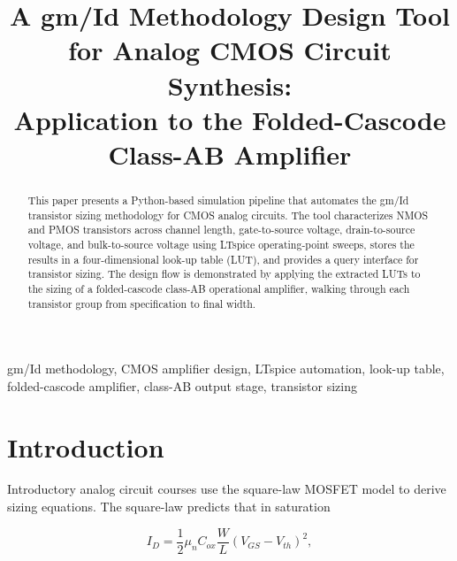 \documentclass[conference]{IEEEtran}
\begin{document}
\title{A gm/Id Methodology Design Tool for Analog CMOS Circuit Synthesis:\\
Application to the Folded-Cascode Class-AB Amplifier}

\author{
}

\maketitle

\begin{abstract}
This paper presents a Python-based simulation pipeline that automates the
gm/Id transistor sizing methodology for CMOS analog circuits.  The tool
characterizes NMOS and PMOS transistors across channel length, gate-to-source
voltage, drain-to-source voltage, and bulk-to-source voltage using LTspice
operating-point sweeps, stores the results in a four-dimensional look-up
table (LUT), and provides a query interface for transistor sizing.  The
design flow is demonstrated by applying the extracted LUTs to the sizing of
a folded-cascode class-AB operational amplifier, walking through each
transistor group from specification to final width.
\end{abstract}

\begin{IEEEkeywords}
gm/Id methodology, CMOS amplifier design, LTspice automation, look-up
table, folded-cascode amplifier, class-AB output stage, transistor sizing
\end{IEEEkeywords}

\section{Introduction}

Introductory analog circuit courses use the square-law MOSFET model to
derive sizing equations.  The square-law predicts that in saturation

\begin{equation}
  I_D = \frac{1}{2} \mu_n C_{ox} \frac{W}{L} (V_{GS} - V_{th})^2,
  \label{eq:squarelaw}
\end{equation}
\end{document}
